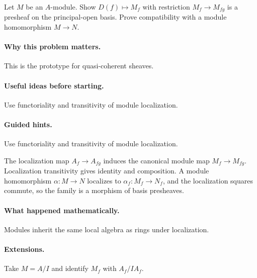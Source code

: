 \begin{problem}
Let $M$ be an $A$-module.  Show $D(f)\mapsto M_f$ with restriction $M_f\to M_{fg}$ is a presheaf on the principal-open basis.  Prove compatibility with a module homomorphism $M\to N$.
\end{problem}

\paragraph{Why this problem matters.}
This is the prototype for quasi-coherent sheaves.

\paragraph{Useful ideas before starting.}
Use functoriality and transitivity of module localization.

\paragraph{Guided hints.}
Use functoriality and transitivity of module localization.

\begin{solution}
The localization map $A_f\to A_{fg}$ induces the canonical module map $M_f\to M_{fg}$.  Localization transitivity gives identity and composition.  A module homomorphism $\alpha:M\to N$ localizes to $\alpha_f:M_f\to N_f$, and the localization squares commute, so the family is a morphism of basis presheaves.
\end{solution}

\paragraph{What happened mathematically.}
Modules inherit the same local algebra as rings under localization.

\paragraph{Extensions.}
Take $M=A/I$ and identify $M_f$ with $A_f/IA_f$.
